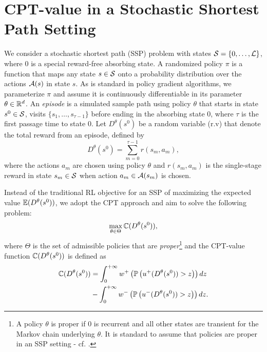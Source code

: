 \section{CPT-value in a Stochastic Shortest Path Setting}
\label{sec:cpt-ssp}
We consider a stochastic shortest path (SSP) problem with states $\S=\{0,\ldots,\L\}$, where $0$ is a special reward-free absorbing state.  A randomized policy $\pi$ is a function that maps any state $s\in \S$ onto a probability distribution over the actions $\A(s)$ in state $s$. As is standard in policy gradient algorithms, we parameterize $\pi$ and assume it is continuously differentiable in its parameter $\theta \in \R^d$.  
An \textit{episode} is a simulated sample path using policy $\theta$ that starts in state $s^0\in \S$, visits $\{s_1,\ldots, s_{\tau-1}\}$ before ending in the absorbing state $0$, where $\tau$ is the first passage time to state $0$.
Let $D^\theta(s^0)$ be a random variable (r.v) that denote the total reward from an episode, defined by
$$ D^\theta(s^0) = \sum\limits_{m=0}^{\tau-1} r(s_m,a_m), $$
where the actions $a_m$ are chosen using policy $\theta$ and $r(s_m, a_m)$ is the single-stage reward in state $s_m\in \S$ when action $a_m \in \A(s_m)$ is chosen. 

Instead of the traditional RL objective for an SSP of maximizing the expected value $\E (D^\theta(s^0))$, 
we adopt the CPT approach and aim to solve the following problem: 
$$ \max_{\theta \in \Theta} \C(D^\theta(s^0)),$$
where $\Theta$ is the set of admissible policies that are \textit{proper}\footnote{A policy $\theta$ is proper if $0$ is recurrent and all other states are transient for the Markov chain underlying $\theta$. It is standard to assume that policies are proper in an SSP setting - cf. \cite{bertsekas1995dynamic}.} and the CPT-value function $\C(D^\theta(s^0))$ is defined as
\begin{align}
\C(D^\theta(s^0))& = \intinfinity w^+\left(\Prob{u^+(D^\theta(s^0))>z}\right) dz \nonumber
\\&- \intinfinity w^-\left(\Prob{u^-(D^\theta(s^0))>z}\right) dz. \label{eq:cpt-mdp}
\end{align}




